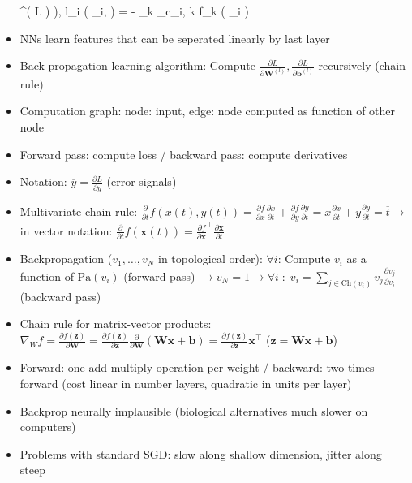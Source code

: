 \documentclass[11pt]{scrartcl}
\begin{document}
\begin{itemize}
        ^{( L )} ), \; l_i ( _i, \bm{\theta} ) = 
        - \sum_k _{c_i, k} \log f_k ( _i ) \)
    \item NNs learn features that can be seperated linearly by last layer
    \item Back-propagation learning algorithm: Compute 
        \( \frac{\partial L}{\partial \bm{W}^{( l )}}, 
        \frac{\partial L}{\partial \bm{b}^{( l )}} \) recursively (chain rule)
    \item Computation graph: node: input, edge: node computed as function of other node
    \item Forward pass: compute loss / backward pass: compute derivatives
    \item Notation: \( \overline{y} = \frac{\partial L}{\partial y} \) (error signals)
    \item Multivariate chain rule: \( \frac{\partial}{\partial t} f ( x ( t ), y ( t ) ) = 
        \frac{\partial f}{\partial x} \frac{\partial x}{\partial t} + 
        \frac{\partial f}{\partial y} \frac{\partial y}{\partial t} = 
        \overline{x} \frac{\partial x}{\partial t} + 
        \overline{y} \frac{\partial y}{\partial t}  = \overline{t} \rightarrow \) in vector 
        notation: \( \frac{\partial}{\partial t} f ( \bm{x} ( t ) ) = 
        \frac{\partial f}{\partial \bm{x}}^\top \frac{\partial \bm{x}}{\partial t} \)
    \item Backpropagation (\( v_1, \dots, v_N \) in topological order): \( \forall i \): Compute 
        \( v_i \) as a function of \( \mathrm{Pa} ( v_i ) \) (forward pass) 
        \( \rightarrow \overline{v_N} = 1 \rightarrow \forall i \; : \; \overline{v_i} = 
        \sum_{j \in \mathrm{Ch} ( v_i )} \overline{v_j} \frac{\partial v_j}{\partial v_i} \) 
        (backward pass)
    \item Chain rule for matrix-vector products: \( \nabla_W f = 
        \frac{\partial f ( \bm{z} )}{\partial \bm{W}} = 
        \frac{\partial f ( \bm{z} )}{\partial \bm{z}} \frac{\partial}{\partial \bm{W}} 
        ( \bm{W x} + \bm{b} ) = \frac{\partial f ( \bm{z} )}{\partial \bm{z}} \bm{x}^\top \) 
        (\( \bm{z} = \bm{W x} + \bm{b} \))
    \item Forward: one add-multiply operation per weight / backward: two times forward 
        (cost linear in number layers, quadratic in units per layer)
    \item Backprop neurally implausible (biological alternatives much slower on computers)
    \item Problems with standard SGD: slow along shallow dimension, jitter along steep 

\end{itemize}
\end{document}
